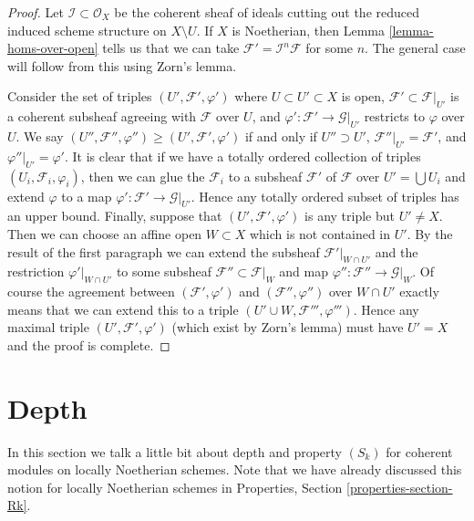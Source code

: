 \begin{proof}
Let $\mathcal{I} \subset \mathcal{O}_X$ be the coherent sheaf of ideals
cutting out the reduced induced scheme structure on $X \setminus U$.
If $X$ is Noetherian, then Lemma \ref{lemma-homs-over-open} tells us that
we can take $\mathcal{F}' = \mathcal{I}^n\mathcal{F}$
for some $n$. The general case will follow from this using Zorn's lemma.

\medskip\noindent
Consider the set of triples $(U', \mathcal{F}', \varphi')$ where
$U \subset U' \subset X$ is open, $\mathcal{F}' \subset \mathcal{F}|_{U'}$
is a coherent subsheaf agreeing with $\mathcal{F}$ over $U$, and
$\varphi' : \mathcal{F}' \to \mathcal{G}|_{U'}$ restricts to
$\varphi$ over $U$. We say
$(U'', \mathcal{F}'', \varphi'') \geq (U', \mathcal{F}', \varphi')$
if and only if $U'' \supset U'$, $\mathcal{F}''|_{U'} = \mathcal{F}'$,
and $\varphi''|_{U'} = \varphi'$.
It is clear that if we have a totally ordered collection
of triples $(U_i, \mathcal{F}_i, \varphi_i)$, then we
can glue the $\mathcal{F}_i$ to a subsheaf $\mathcal{F}'$ of $\mathcal{F}$
over $U' = \bigcup U_i$ and extend $\varphi$ to a map
$\varphi' : \mathcal{F}' \to \mathcal{G}|_{U'}$.
Hence any totally ordered subset of triples has an upper bound.
Finally, suppose that $(U', \mathcal{F}', \varphi')$
is any triple but $U' \not = X$. Then we can choose an
affine open $W \subset X$ which is not contained in $U'$.
By the result of the first paragraph we can extend
the subsheaf $\mathcal{F}'|_{W \cap U'}$ and the restriction
$\varphi'|_{W \cap U'}$ to some subsheaf $\mathcal{F}'' \subset \mathcal{F}|_W$
and map $\varphi'' : \mathcal{F}'' \to \mathcal{G}|_W$.
Of course the agreement between $(\mathcal{F}', \varphi')$ and
$(\mathcal{F}'', \varphi'')$ over $W \cap U'$ exactly means that
we can extend this to a triple $(U' \cup W, \mathcal{F}''', \varphi''')$.
Hence any maximal triple $(U', \mathcal{F}', \varphi')$
(which exist by Zorn's lemma) must have $U' = X$ and the
proof is complete.
\end{proof}









\section{Depth}
\label{section-depth}

\noindent
In this section we talk a little bit about depth and property
$(S_k)$ for coherent modules on locally Noetherian schemes.
Note that we have already discussed this notion for locally
Noetherian schemes in Properties, Section \ref{properties-section-Rk}.

